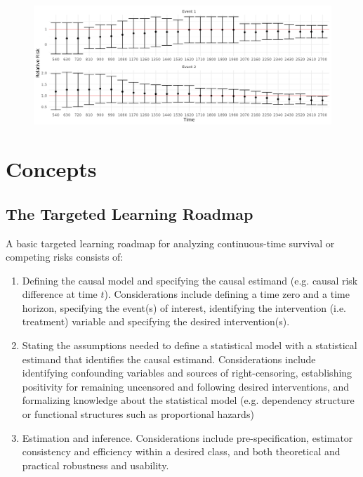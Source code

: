 \documentclass{report}
\newcommand{\1}{\ensuremath{\mathbf{1}}}
\begin{document}
\begin{figure}[H]
\center
\includegraphics[width=\linewidth]{fig/RR.png}
\end{figure}

\section{Concepts}
\label{concepts}
\subsection{The Targeted Learning Roadmap}
\label{sec:org5a02990}
A basic targeted learning roadmap for analyzing continuous-time survival or competing risks consists of:
\begin{enumerate}
  \item Defining the causal model and specifying the causal estimand (e.g. causal risk difference at time $t$). Considerations include defining a time zero and a time horizon, specifying the event(s) of interest, identifying the intervention (i.e. treatment) variable and specifying the desired intervention(s).
  \item Stating the assumptions needed to define a statistical model with a statistical estimand that identifies the causal estimand. Considerations include identifying confounding variables and sources of right-censoring, establishing positivity for remaining uncensored and following desired interventions, and formalizing knowledge about the statistical model (e.g. dependency structure or functional structures such as proportional hazards)
  \item Estimation and inference. Considerations include pre-specification, estimator consistency and efficiency within a desired class, and both theoretical and practical robustness and usability.
\end{enumerate}
\end{document}
